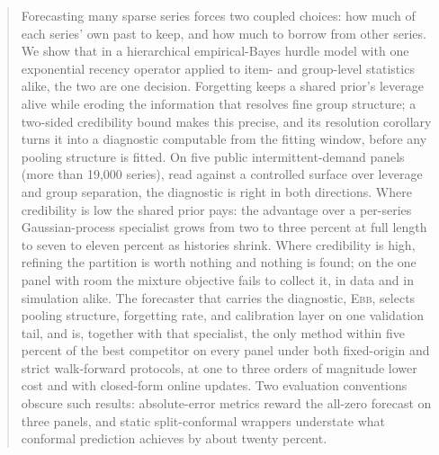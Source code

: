 \documentclass[twoside]{article}
\theoremstyle{definition}
\newcommand{\EBB}{\textsc{Ebb}}
\begin{document}





\begin{abstract}
Forecasting many sparse series forces two coupled choices: how much of
each series' own past to keep, and how much to borrow from other series.
We show that in a hierarchical empirical-Bayes hurdle model with one
exponential recency operator applied to item- and group-level statistics
alike, the two are one decision. Forgetting keeps a shared prior's
leverage alive while eroding the information that resolves fine group
structure; a two-sided credibility bound makes this precise, and its
resolution corollary turns it into a diagnostic computable from the
fitting window, before any pooling structure is fitted. On five public
intermittent-demand panels (more than 19{,}000 series), read against a
controlled surface over leverage and group separation, the diagnostic is
right in both directions. Where credibility is low the shared prior pays:
the advantage over a per-series Gaussian-process specialist grows from
two to three percent at full length to seven to eleven percent as
histories shrink. Where credibility is high, refining the partition is
worth nothing and nothing is found; on the one panel with room the
mixture objective fails to collect it, in data and in simulation alike.
The forecaster that carries the diagnostic, \EBB{}, selects pooling
structure, forgetting rate, and calibration layer on one validation tail,
and is, together with that specialist, the only method within five
percent of the best competitor on every panel under both fixed-origin and
strict walk-forward protocols, at one to three orders of magnitude lower
cost and with closed-form online updates. Two evaluation conventions
obscure such results: absolute-error metrics reward the all-zero forecast
on three panels, and static split-conformal wrappers understate what
conformal prediction achieves by about twenty percent.
\end{abstract}
\end{document}
